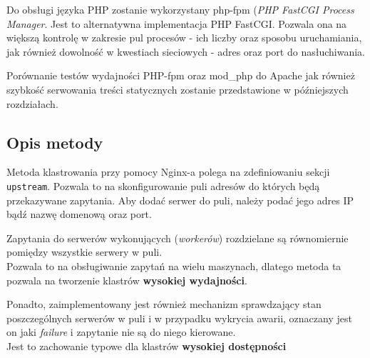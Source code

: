 {Do obsługi języka PHP zostanie wykorzystany php-fpm (\textit{PHP FastCGI Process Manager}.
Jest to alternatywna implementacja PHP FastCGI.
Pozwala ona na większą kontrolę w zakresie pul procesów - ich liczby oraz sposobu uruchamiania, jak również dowolność w kwestiach sieciowych - adres oraz port do nasłuchiwania.

Porównanie testów wydajności PHP-fpm oraz mod\_php do Apache jak również szybkość serwowania treści statycznych zostanie przedstawione w późniejszych rozdziałach.
\subsection{Opis metody}
Metoda klastrowania przy pomocy Nginx-a polega na zdefiniowaniu sekcji \texttt{upstream}.
Pozwala to na skonfigurowanie puli adresów do których będą przekazywane zapytania.
Aby dodać serwer do puli, należy podać jego adres IP bądź nazwę domenową oraz port.

Zapytania do serwerów wykonujących (\textit{workerów}) rozdzielane są równomiernie pomiędzy wszystkie serwery w puli.\\
Pozwala to na obsługiwanie zapytań na wielu maszynach, dlatego metoda ta pozwala na tworzenie klastrów \textbf{wysokiej wydajności}.

Ponadto, zaimplementowany jest również mechanizm sprawdzający stan poszczególnych serwerów w puli i w przypadku wykrycia awarii, oznaczany jest on jaki \textit{failure} i zapytanie nie są do niego kierowane.\\
Jest to zachowanie typowe dla klastrów \textbf{wysokiej dostępności}

}
